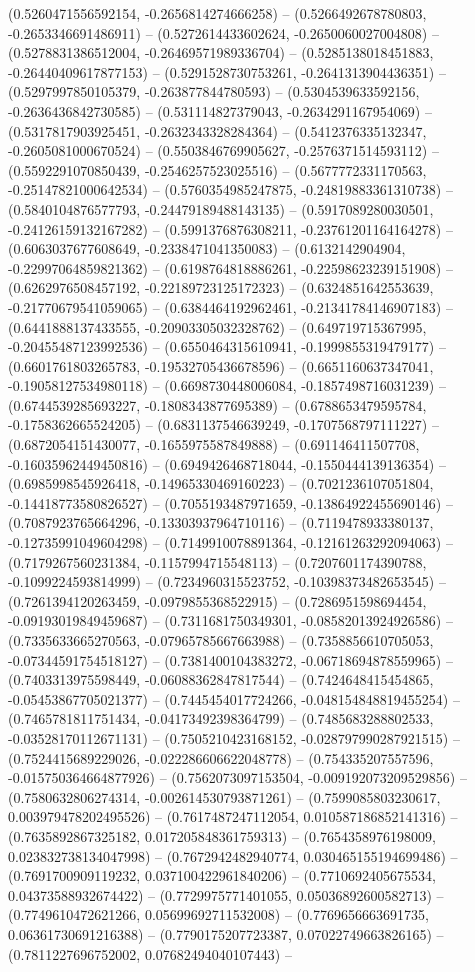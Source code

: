 (0.5260471556592154, -0.2656814274666258) -- (0.5266492678780803, -0.2653346691486911) -- (0.5272614433602624, -0.2650060027004808) -- (0.5278831386512004, -0.26469571989336704) -- (0.5285138018451883, -0.26440409617877153) -- (0.5291528730753261, -0.2641313904436351) -- (0.5297997850105379, -0.263877844780593) -- (0.5304539633592156, -0.2636436842730585) -- (0.531114827379043, -0.2634291167954069) -- (0.5317817903925451, -0.2632343328284364) -- (0.5412376335132347, -0.2605081000670524) -- (0.5503846769905627, -0.2576371514593112) -- (0.5592291070850439, -0.2546257523025516) -- (0.5677772331170563, -0.25147821000642534) -- (0.5760354985247875, -0.24819883361310738) -- (0.5840104876577793, -0.24479189488143135) -- (0.5917089280030501, -0.24126159132167282) -- (0.5991376876308211, -0.23761201164164278) -- (0.6063037677608649, -0.2338471041350083) -- (0.6132142904904, -0.22997064859821362) -- (0.6198764818886261, -0.22598623239151908) -- (0.6262976508457192, -0.22189723125172323) -- (0.6324851642553639, -0.21770679541059065) -- (0.6384464192962461, -0.21341784146907183) -- (0.6441888137433555, -0.20903305032328762) -- (0.649719715367995, -0.20455487123992536) -- (0.6550464315610941, -0.1999855319479177) -- (0.6601761803265783, -0.19532705436678596) -- (0.6651160637347041, -0.19058127534980118) -- (0.6698730448006084, -0.1857498716031239) -- (0.6744539285693227, -0.1808343877695389) -- (0.6788653479595784, -0.1758362665524205) -- (0.6831137546639249, -0.1707568797111227) -- (0.6872054151430077, -0.1655975587849888) -- (0.691146411507708, -0.16035962449450816) -- (0.6949426468718044, -0.1550444139136354) -- (0.6985998545926418, -0.14965330469160223) -- (0.7021236107051804, -0.14418773580826527) -- (0.7055193487971659, -0.13864922455690146) -- (0.7087923765664296, -0.13303937964710116) -- (0.7119478933380137, -0.12735991049604298) -- (0.7149910078891364, -0.12161263292094063) -- (0.7179267560231384, -0.1157994715548113) -- (0.7207601174390788, -0.1099224593814999) -- (0.7234960315523752, -0.10398373482653545) -- (0.7261394120263459, -0.0979855368522915) -- (0.7286951598694454, -0.09193019849459687) -- (0.7311681750349301, -0.08582013924926586) -- (0.7335633665270563, -0.07965785667663988) -- (0.7358856610705053, -0.07344591754518127) -- (0.7381400104383272, -0.06718694878559965) -- (0.7403313975598449, -0.06088362847817544) -- (0.7424648415454865, -0.05453867705021377) -- (0.7445454017724266, -0.048154848819455254) -- (0.7465781811751434, -0.04173492398364799) -- (0.7485683288802533, -0.03528170112671131) -- (0.7505210423168152, -0.028797990287921515) -- (0.7524415689229026, -0.022286606622048778) -- (0.754335207557596, -0.015750364664877926) -- (0.7562073097153504, -0.009192073209529856) -- (0.7580632806274314, -0.002614530793871261) -- (0.7599085803230617, 0.003979478202495526) -- (0.7617487247112054, 0.010587186852141316) -- (0.7635892867325182, 0.017205848361759313) -- (0.7654358976198009, 0.023832738134047998) -- (0.7672942482940774, 0.030465155194699486) -- (0.7691700909119232, 0.037100422961840206) -- (0.7710692405675534, 0.04373588932674422) -- (0.7729975771401055, 0.05036892600582713) -- (0.7749610472621266, 0.05699692711532008) -- (0.7769656663691735, 0.06361730691216388) -- (0.7790175207723387, 0.07022749663826165) -- (0.7811227696752002, 0.07682494040107443) -- 